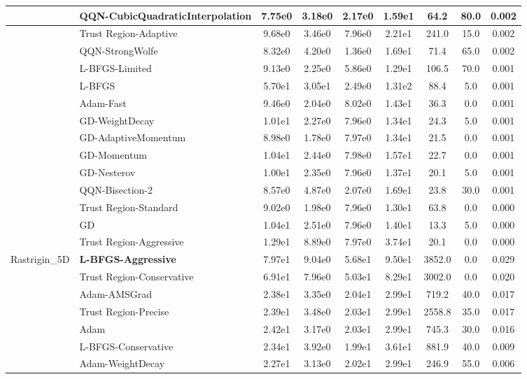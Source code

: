 \documentclass{article}
\begin{document}
\begin{longtable}{|l|l|c|c|c|c|c|c|c|}
\hline
 & QQN-CubicQuadraticInterpolation & 7.75e0 & 3.18e0 & 2.17e0 & 1.59e1 & 64.2 & 80.0 & 0.002 \\
\hline
 & Trust Region-Adaptive & 9.68e0 & 3.46e0 & 7.96e0 & 2.21e1 & 241.0 & 15.0 & 0.002 \\
\hline
 & QQN-StrongWolfe & 8.32e0 & 4.20e0 & 1.36e0 & 1.69e1 & 71.4 & 65.0 & 0.002 \\
\hline
 & L-BFGS-Limited & 9.13e0 & 2.25e0 & 5.86e0 & 1.29e1 & 106.5 & 70.0 & 0.001 \\
\hline
 & L-BFGS & 5.70e1 & 3.05e1 & 2.49e0 & 1.31e2 & 88.4 & 5.0 & 0.001 \\
\hline
 & Adam-Fast & 9.46e0 & 2.04e0 & 8.02e0 & 1.43e1 & 36.3 & 0.0 & 0.001 \\
\hline
 & GD-WeightDecay & 1.01e1 & 2.27e0 & 7.96e0 & 1.34e1 & 24.3 & 5.0 & 0.001 \\
\hline
 & GD-AdaptiveMomentum & 8.98e0 & 1.78e0 & 7.97e0 & 1.34e1 & 21.5 & 0.0 & 0.001 \\
\hline
 & GD-Momentum & 1.04e1 & 2.44e0 & 7.98e0 & 1.57e1 & 22.7 & 0.0 & 0.001 \\
\hline
 & GD-Nesterov & 1.00e1 & 2.35e0 & 7.96e0 & 1.37e1 & 20.1 & 5.0 & 0.001 \\
\hline
 & QQN-Bisection-2 & 8.57e0 & 4.87e0 & 2.07e0 & 1.69e1 & 23.8 & 30.0 & 0.001 \\
\hline
 & Trust Region-Standard & 9.02e0 & 1.98e0 & 7.96e0 & 1.30e1 & 63.8 & 0.0 & 0.000 \\
\hline
 & GD & 1.04e1 & 2.51e0 & 7.96e0 & 1.40e1 & 13.3 & 5.0 & 0.000 \\
\hline
 & Trust Region-Aggressive & 1.29e1 & 8.89e0 & 7.97e0 & 3.74e1 & 20.1 & 0.0 & 0.000 \\
Rastrigin\_5D & \textbf{L-BFGS-Aggressive} & 7.97e1 & 9.04e0 & 5.68e1 & 9.50e1 & 3852.0 & 0.0 & 0.029 \\
\hline
 & Trust Region-Conservative & 6.91e1 & 7.96e0 & 5.03e1 & 8.29e1 & 3002.0 & 0.0 & 0.020 \\
\hline
 & Adam-AMSGrad & 2.38e1 & 3.35e0 & 2.04e1 & 2.99e1 & 719.2 & 40.0 & 0.017 \\
\hline
 & Trust Region-Precise & 2.39e1 & 3.48e0 & 2.03e1 & 2.99e1 & 2558.8 & 35.0 & 0.017 \\
\hline
 & Adam & 2.42e1 & 3.17e0 & 2.03e1 & 2.99e1 & 745.3 & 30.0 & 0.016 \\
\hline
 & L-BFGS-Conservative & 2.34e1 & 3.92e0 & 1.99e1 & 3.61e1 & 881.9 & 40.0 & 0.009 \\
\hline
 & Adam-WeightDecay & 2.27e1 & 3.13e0 & 2.02e1 & 2.99e1 & 246.9 & 55.0 & 0.006 \\

\end{longtable}
\end{document}
